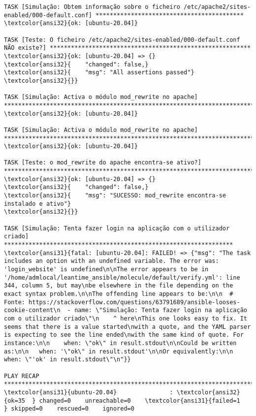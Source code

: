 \documentclass{scrartcl}
\begin{document}
\begin{Verbatim}
TASK [Simulação: Obtem informação sobre o ficheiro /etc/apache2/sites-enabled/000-default.conf] ******************************************
\textcolor{ansi32}{ok: [ubuntu-20.04]}

TASK [Teste: O ficheiro /etc/apache2/sites-enabled/000-default.conf NÃO existe?] *********************************************************
\textcolor{ansi32}{ok: [ubuntu-20.04] => {}
\textcolor{ansi32}{    "changed": false,}
\textcolor{ansi32}{    "msg": "All assertions passed"}
\textcolor{ansi32}{}}

TASK [Simulação: Activa o módulo mod_rewrite no apache] **********************************************************************************
\textcolor{ansi32}{ok: [ubuntu-20.04]}

TASK [Simulação: Activa o módulo mod_rewrite no apache] **********************************************************************************
\textcolor{ansi32}{ok: [ubuntu-20.04]}

TASK [Teste: o mod_rewrite do apache encontra-se ativo?] *********************************************************************************
\textcolor{ansi32}{ok: [ubuntu-20.04] => {}
\textcolor{ansi32}{    "changed": false,}
\textcolor{ansi32}{    "msg": "SUCESSO: mod_rewrite encontra-se instalado e ativo"}
\textcolor{ansi32}{}}

TASK [Simulação: Tenta fazer login na aplicação com o utilizador criado] *****************************************************************
\textcolor{ansi31}{fatal: [ubuntu-20.04]: FAILED! => {"msg": "The task includes an option with an undefined variable. The error was: 'login_website' is undefined\n\nThe error appears to be in '/home/admlocal/leantime_ansible/molecule/default/verify.yml': line 344, column 5, but may\nbe elsewhere in the file depending on the exact syntax problem.\n\nThe offending line appears to be:\n\n  # Fonte: https://stackoverflow.com/questions/63791689/ansible-looses-cookie-content\n  - name: \"Simulação: Tenta fazer login na aplicação com o utilizador criado\"\n    ^ here\nThis one looks easy to fix. It seems that there is a value started\nwith a quote, and the YAML parser is expecting to see the line ended\nwith the same kind of quote. For instance:\n\n    when: \"ok\" in result.stdout\n\nCould be written as:\n\n   when: '\"ok\" in result.stdout'\n\nOr equivalently:\n\n   when: \"'ok' in result.stdout\"\n"}}

PLAY RECAP *******************************************************************************************************************************
\textcolor{ansi31}{ubuntu-20.04}               : \textcolor{ansi32}{ok=35  } changed=0    unreachable=0    \textcolor{ansi31}{failed=1   } skipped=0    rescued=0    ignored=0



\end{Verbatim}
\end{document}

